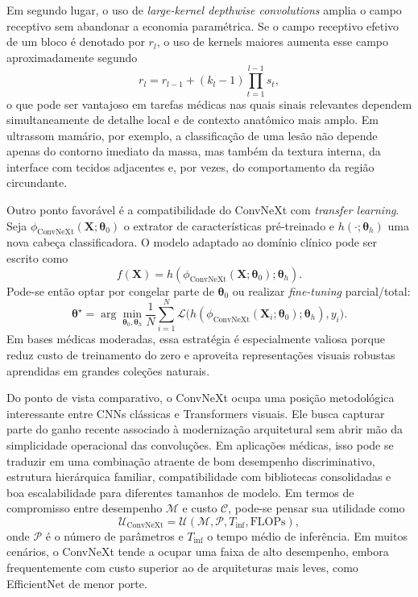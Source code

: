 \documentclass[tcc,capa]{texufpel}
\begin{document}
Em segundo lugar, o uso de \textit{large-kernel depthwise convolutions} amplia o campo receptivo sem abandonar a economia paramétrica. Se o campo receptivo efetivo de um bloco é denotado por \(r_l\), o uso de kernels maiores aumenta esse campo aproximadamente segundo
\begin{equation}
	r_l = r_{l-1} + (k_l - 1)\prod_{t=1}^{l-1}s_t,
\end{equation}
o que pode ser vantajoso em tarefas médicas nas quais sinais relevantes dependem simultaneamente de detalhe local e de contexto anatômico mais amplo. Em ultrassom mamário, por exemplo, a classificação de uma lesão não depende apenas do contorno imediato da massa, mas também da textura interna, da interface com tecidos adjacentes e, por vezes, do comportamento da região circundante.

Outro ponto favorável é a compatibilidade do ConvNeXt com \textit{transfer learning}. Seja \(\phi_{\text{ConvNeXt}}(\mathbf{X};\boldsymbol{\theta}_0)\) o extrator de características pré-treinado e \(h(\cdot;\boldsymbol{\theta}_h)\) uma nova cabeça classificadora. O modelo adaptado ao domínio clínico pode ser escrito como
\begin{equation}
	f(\mathbf{X}) = h\!\left(\phi_{\text{ConvNeXt}}(\mathbf{X};\boldsymbol{\theta}_0);\boldsymbol{\theta}_h\right).
\end{equation}
Pode-se então optar por congelar parte de \(\boldsymbol{\theta}_0\) ou realizar \textit{fine-tuning} parcial/total:
\begin{equation}
	\boldsymbol{\theta}^{\star}
	=
	\arg\min_{\boldsymbol{\theta}_0,\boldsymbol{\theta}_h}
	\frac{1}{N}\sum_{i=1}^{N}
	\mathcal{L}\big(
	h(\phi_{\text{ConvNeXt}}(\mathbf{X}_i;\boldsymbol{\theta}_0);\boldsymbol{\theta}_h),
	y_i
	\big).
\end{equation}
Em bases médicas moderadas, essa estratégia é especialmente valiosa porque reduz custo de treinamento do zero e aproveita representações visuais robustas aprendidas em grandes coleções naturais.

Do ponto de vista comparativo, o ConvNeXt ocupa uma posição metodológica interessante entre CNNs clássicas e Transformers visuais. Ele busca capturar parte do ganho recente associado à modernização arquitetural sem abrir mão da simplicidade operacional das convoluções. Em aplicações médicas, isso pode se traduzir em uma combinação atraente de bom desempenho discriminativo, estrutura hierárquica familiar, compatibilidade com bibliotecas consolidadas e boa escalabilidade para diferentes tamanhos de modelo. Em termos de compromisso entre desempenho \(\mathcal{M}\) e custo \(\mathcal{C}\), pode-se pensar sua utilidade como
\begin{equation}
	\mathcal{U}_{\text{ConvNeXt}} = \mathcal{U}(\mathcal{M}, \mathcal{P}, T_{\text{inf}}, \text{FLOPs}),
\end{equation}
onde \(\mathcal{P}\) é o número de parâmetros e \(T_{\text{inf}}\) o tempo médio de inferência. Em muitos cenários, o ConvNeXt tende a ocupar uma faixa de alto desempenho, embora frequentemente com custo superior ao de arquiteturas mais leves, como EfficientNet de menor porte.
\end{document}
